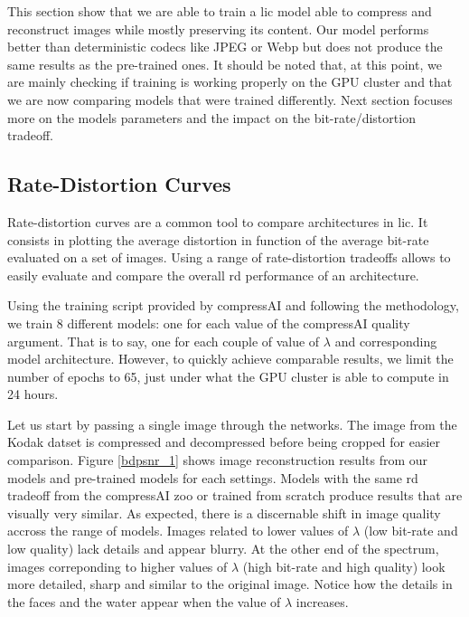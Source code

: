 This section show that we are able to train a \acrshort{lic} model able to compress and reconstruct images while mostly preserving its content. Our model performs better than deterministic codecs like JPEG or Webp but does not produce the same results as the pre-trained ones. It should be noted that, at this point, we are mainly checking if training is working properly on the GPU cluster and that we are now comparing models that were trained differently. Next section focuses more on the models parameters and the impact on the bit-rate/distortion tradeoff.

\subsection{Rate-Distortion Curves}
Rate-distortion curves are a common tool to compare  architectures in \acrshort{lic}. It consists in plotting the average distortion in function of the average bit-rate evaluated on a set of images. Using a range of rate-distortion tradeoffs allows to easily evaluate and compare the overall \acrshort{rd} performance of an architecture.

Using the training script provided by compressAI and following the methodology, we train 8 different models: one for each value of the compressAI \textsf{quality} argument. That is to say, one for each couple of value of \(\lambda\) and corresponding model architecture. However, to quickly achieve comparable results, we limit the number of epochs to 65, just under what the GPU cluster is able to compute in 24 hours.

Let us start by passing a single image through the networks. The image from the Kodak datset is compressed and decompressed before being cropped for easier comparison. Figure \ref{bdpsnr_1} shows image reconstruction results from our models and pre-trained models for each settings. Models with the same \acrshort{rd} tradeoff from the compressAI zoo or trained from scratch produce results that are visually very similar. As expected, there is a discernable shift in image quality accross the range of models. Images related to lower values of \(\lambda\) (low bit-rate and low quality) lack details and appear blurry. At the other end of the spectrum, images correponding to higher values of \(\lambda\) (high bit-rate and high quality) look more detailed, sharp and similar to the original image. Notice how the details in the faces and the water appear when the value of \(\lambda\) increases.

